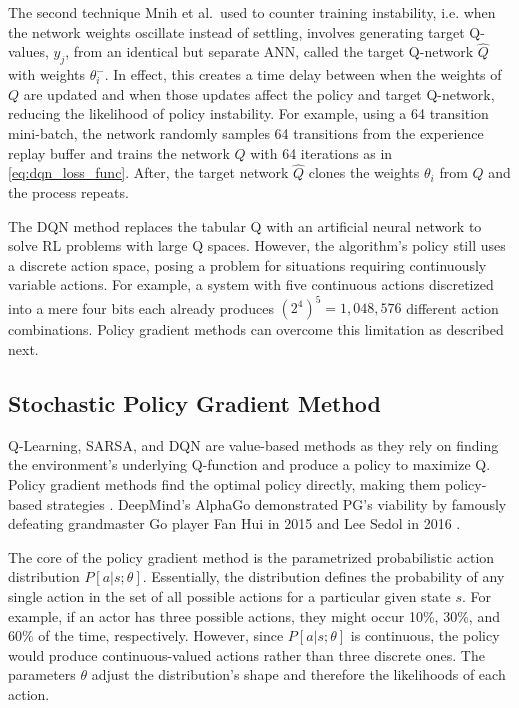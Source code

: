 The second technique Mnih et al.\ used to counter training instability, i.e. when the network weights oscillate instead of settling, involves generating target Q-values, $y_j$, from an identical but separate ANN, called the target Q-network $\hat{Q}$ with weights $\theta^-_i$. In effect, this creates a time delay between when the weights of $Q$ are updated and when those updates affect the policy and target Q-network, reducing the likelihood of policy instability. For example, using a 64 transition mini-batch, the network randomly samples 64 transitions from the experience replay buffer and trains the network $Q$ with 64 iterations as in \ref{eq:dqn_loss_func}. After, the target network $\hat{Q}$ clones the weights $\theta_i$ from $Q$ and the process repeats.

The DQN method replaces the tabular Q with an artificial neural network to solve RL problems with large Q spaces. However, the algorithm's policy still uses a discrete action space, posing a problem for situations requiring continuously variable actions. For example, a system with five continuous actions discretized into a mere four bits each already produces $(2^4)^5=1,048,576$ different action combinations. Policy gradient methods can overcome this limitation as described next.

\subsection{Stochastic Policy Gradient Method}
Q-Learning, SARSA, and DQN are value-based methods as they rely on finding the environment's underlying Q-function and produce a policy to maximize Q. Policy gradient methods find the optimal policy directly, making them policy-based strategies \cite{sutton_policygrad}. DeepMind's AlphaGo demonstrated PG's viability by famously defeating grandmaster Go player Fan Hui in 2015 and Lee Sedol in 2016 \cite{silver_2017}.

The core of the policy gradient method is the parametrized probabilistic action distribution $P[a|s;\theta]$. Essentially, the distribution defines the probability of any single action in the set of all possible actions for a particular given state $s$. For example, if an actor has three possible actions, they might occur 10\%, 30\%, and 60\% of the time, respectively. However, since $P[a|s;\theta]$ is continuous, the policy would produce continuous-valued actions rather than three discrete ones. The parameters $\theta$ adjust the distribution's shape and therefore the likelihoods of each action. 

